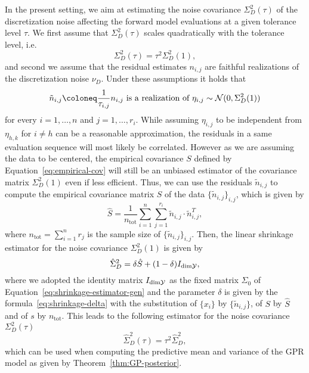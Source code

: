 In the present setting, we aim at estimating the noise covariance $\Sigma^2_D(\tau)$ of the discretization noise affecting the forward model evaluations at a given tolerance level $\tau$.
We first assume that $\Sigma^2_D(\tau)$ scales quadratically with the tolerance level, i.e. 
\[
\Sigma^2_D(\tau) = \tau^2 \Sigma^2_D(1),
\]
and second we assume that the residual estimates $n_{i,j}$ are faithful realizations of the discretization noise $\nu_D$.
Under these assumptions it holds that 
\[
\tilde n_{i,j} \coloneq \frac{1}{\tau_{i,j}} n_{i,j} \text{ is a realization of } \eta_{i,j} \sim \mc N (0, \Sigma^2_D(1))
\]
for every $ i=1,\dots,n $ and $ j=1,\dots,r_i$. \newline
While assuming $\eta_{i,j}$ to be independent from $\eta_{h,k}$ for $i\neq h$ can be a reasonable approximation, the residuals in a same evaluation sequence will most likely be correlated.
However as we are assuming the data to be centered, the empirical covariance $S$ defined by Equation~\eqref{eq:empirical-cov} will still be an unbiased estimator of the covariance matrix $\Sigma^2_D(1)$ even if less efficient.
Thus, we can use the residuals $\tilde n_{i,j}$ to compute the empirical covariance matrix $S$ of the data $\{\tilde n_{i,j}\}_{i,j}$, which is given by  
\begin{equation}
    \hat S = \frac{1}{n_{\text{tot}}} \sum_{i=1}^n\sum_{j=1}^{r_i} \tilde n_{i,j} \cdot \tilde n_{i,j}^T,
\end{equation} 
where $n_{\text{tot}} = \sum_{i=1}^n r_j $ is the sample size of $\{\tilde  n_{i,j}\}_{i,j}$. \newline
Then, the linear shrinkage estimator for the noise covariance $\Sigma^2_D(1)$ is given by
\[
    \hat \Sigma_D^2 = \delta \hat S + (1-\delta) I_{\text{dim}\mathcal Y},
\]
where we adopted the identity matrix $I_{\text{dim}\mathcal Y}$ as the fixed matrix $\Sigma_0$ of Equation~\eqref{eq:shrinkage-estimator-gen} and the parameter $\delta$ is given by the formula~\eqref{eq:shrinkage-delta} with the substitution of $\{x_i\}$ by $\{\tilde n_{i,j}\}$, of $S$ by $\hat S$ and of $s$ by $n_{\text{tot}}$.\newline
This leads to the following estimator for the noise covariance $\Sigma^2_D(\tau)$
\begin{equation}\label{eq:shrinkage-estimator}
    \hat{\Sigma}_D^2(\tau) = \tau^2 \hat \Sigma_D^2,
\end{equation}
which can be used when computing the predictive mean and variance of the GPR model as given by Theorem~\ref{thm:GP-posterior}.

